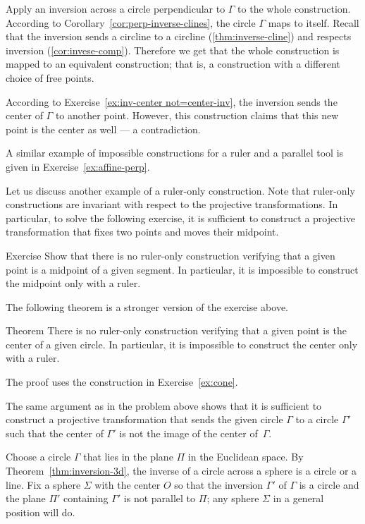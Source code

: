 Apply an inversion across a circle perpendicular to $\Gamma$ to the whole construction.
According to Corollary~\ref{cor:perp-inverse-clines},
the circle
$\Gamma$ maps to itself.
Recall that the inversion sends a circline to a circline (\ref{thm:inverse-cline}) and respects inversion (\ref{cor:invese-comp}).
Therefore we get that the whole  construction is mapped to an equivalent construction; 
that is, a construction with a different choice of free points.

According to Exercise~\ref{ex:inv-center not=center-inv}, 
the inversion sends the center of $\Gamma$ to another point.
However, this construction claims that this new point is the center as well --- a contradiction.
\qeds

A similar example of impossible constructions for a ruler and a parallel tool
 is given in Exercise~\ref{ex:affine-perp}.
 
Let us discuss another example of a ruler-only construction.
Note that ruler-only constructions are invariant with respect to the projective transformations. 
In particular, to solve the following exercise, it is sufficient to construct a projective transformation that fixes two points and moves their midpoint.

\begin{thm}{Exercise}\label{ex:midpoint-proj}
Show that there is no ruler-only construction verifying that a given point is a  midpoint of a given segment.
In particular, it is impossible to construct the midpoint only with a ruler.
\end{thm}

The following theorem is a stronger version of the exercise above.

\begin{thm}{Theorem}\label{thm:circle-center-proj}
There is no ruler-only construction verifying that a given point is the center of a given circle.
In particular, it is impossible to construct the center only with a ruler.
\end{thm}

The proof uses the construction in Exercise~\ref{ex:cone}.

The same argument as in the problem above shows that 
it is sufficient to construct a projective transformation 
that sends the given circle $\Gamma$ to a circle $\Gamma'$ such that the center of $\Gamma'$ is not the image of the center of~$\Gamma$.

Choose a circle $\Gamma$ that lies in the plane $\Pi$ in the Euclidean space.
By Theorem~\ref{thm:inversion-3d}, 
the inverse of a circle across a sphere is a circle or a line.
Fix a sphere $\Sigma$ with the center $O$ so that the inversion $\Gamma'$ of $\Gamma$
is a circle and the plane $\Pi'$ containing $\Gamma'$ is not parallel to $\Pi$;
any sphere $\Sigma$ in a general position will do.

